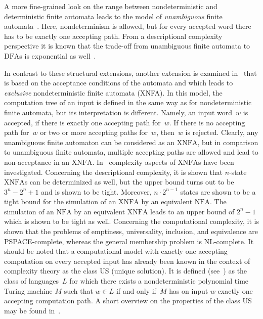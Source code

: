 \documentclass[final,copyright,noderivs]{eptcs}
\theoremstyle{plain}
\theoremstyle{definition}
\newcommand{\dfa}{\textrm{DFA}}
\newcommand{\nfa}{\textrm{NFA}}
\newcommand{\xnfa}{\textrm{XNFA}}
\begin{document}
A more fine-grained look on the range between nondeterministic and deterministic finite automata leads to the 
model of \emph{unambiguous} finite automata~\cite{schmidt:1978:sdcfrfl}. Here, nondeterminism is allowed, 
but for every accepted word there has to be exactly one accepting path. 
From a descriptional complexity perspective it is known that 
the trade-off from unambiguous finite automata to $\dfa$s is exponential as \mbox{well 
\cite{leung:1998:seafapafa,leung:2005:dcnfada,schmidt:1978:sdcfrfl}.}

In contrast to these structural extensions, another extension is examined in~\cite{kutrib:2023:coenfa:proc,kutrib:2023:coenfa} 
that is based on the acceptance conditions of the automata and which leads 
to \emph{exclusive} nondeterministic finite automata (\xnfa). 
In this model, the computation tree of an input is defined in the same way as for nondeterministic finite 
automata, but its interpretation is different. Namely, an input word~$w$ is accepted, if there is 
exactly one accepting path for~$w$. If there is no accepting path for~$w$ or two or more accepting paths for~$w$, 
then~$w$ is rejected. Clearly, any unambiguous finite automaton can be considered as an $\xnfa$, but in comparison 
to unambiguous finite automata, multiple accepting paths are allowed and lead to non-acceptance in an $\xnfa$.
In~\cite{kutrib:2023:coenfa:proc,kutrib:2023:coenfa} complexity aspects of $\xnfa$s have been investigated.
Concerning the descriptional complexity, it is shown that $n$-state $\xnfa$s can be determinized 
as well, but the upper bound turns out to be $3^n-2^n+1$ and is shown to be tight. Moreover, 
$n\cdot 2^{n-1}$ states are shown to be a tight bound for the simulation of an $\xnfa$ by an equivalent $\nfa$.
The simulation of an $\nfa$ by an equivalent $\xnfa$ leads to an upper bound of $2^n-1$ which is shown
to be tight as well. Concerning the computational complexity, it is shown that the problems of emptiness, 
universality, inclusion, and equivalence are {\sf PSPACE}-complete, whereas the general membership problem is 
{\sf NL}-complete. It should be noted that a computational model with exactly one accepting computation 
on every accepted input has already been known in the context of complexity theory as the class \textsf{US}
(unique solution). It is defined (see~\cite{Blass:1982:otusp}) 
as the class of languages~$L$ for which there 
exists a nondeterministic polynomial time Turing machine $M$ such that
$w \in L$ if and only if~$M$ has on input $w$ exactly one accepting computation path.
A short overview on the properties of the class \textsf{US} may be found in~\cite{Hemaspaandra:2002:tctc}.
\end{document}
